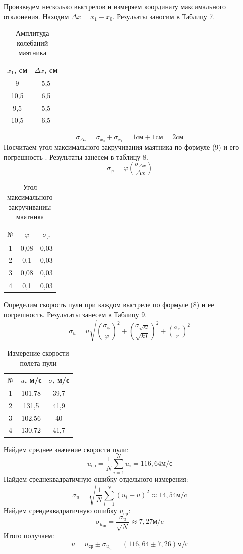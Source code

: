 \documentclass[a4paper,12pt]{article} %
\begin{document}
Произведем несколько выстрелов и измеряем координату максимального отклонения. Находим $\Delta x = x_1-x_0$. Резульаты заносим в Таблицу 7.
\begin{table}[h]
\caption{Амплитуда колебаний маятника}
\centering
\begin{tabular}{|c|c|}
\hline
$x_1$, cм & $\Delta x$, cм \\ \hline
9 & 5,5 \\ \hline
10,5 & 6,5\\ \hline
9,5 & 5,5\\ \hline
10,5 & 6,5\\ \hline
\end{tabular}
\end{table}
\[\sigma_{\Delta_x} = \sigma_{x_0} + \sigma_{x_1} = 1\text{cм}+1\text{cм} = 2\text{cм}\]
Посчитаем угол максимального закручивания маятника по формуле (9) и его погрешность . Результаты занесем в таблицу 8. 
\[\sigma_{\varphi} = \varphi\left(\frac{\sigma_{\Delta x}}{\Delta x}\right)\]
\begin{table}[!h]
\caption{Угол максимального закручиваниы маятника}
\centering
\begin{tabular}{|c|c|c|}
\hline
$\text{№}$ & $\varphi$ & $\sigma_\varphi$ \\ \hline
1 & 0,08 & 0,03\\ \hline
2 & 0,1 & 0,03\\ \hline
3 & 0,08 & 0,03\\ \hline
4 & 0,1 & 0,03\\ \hline
\end{tabular}
\end{table}
\newpage
Определим скорость пули при каждом выстреле по формуле (8) и ее погрешность. Результаты занесем в Таблицу 9.
\[\sigma_u = u\sqrt{\left(\frac{\sigma_{\varphi}}{\varphi}\right)^2+\left(\frac{\sigma_{\sqrt{kI}}}{\sqrt{kI}}\right)^2+\left(\frac{\sigma_r}{r}\right)^2}\]
\begin{table}[h]
\centering
\caption{Измерение скорости полета пули}
\begin{tabular}{|c|c|c|}
\hline
$\text{№}$ & $u$, м/с & $\sigma$, м/с \\ \hline
1 & 101,78 & 39,7\\ \hline
2 & 131,5& 41,9\\ \hline
3& 102,56 & 40\\ \hline
4 & 130,72 & 41,7\\ \hline
\end{tabular}
\end{table}
Найдем среднее значение скорости пули:
\[u_\text{ср} = \frac{1}{N}\sum_{i=1}^{N}u_i = 116,64\text{м/с}\]
Найдем среднеквадратичную ошибку отдельного измерения:
\[\sigma_u = \sqrt{\frac{1}{N}\sum_{i=1}^N(u_i-\overline{u})^2} \approx 14,54\text{м/c}\]
Найдем срендеквадратичную ошибку ${u_\text{ср}}$:
\[\sigma_{u_\text{ср}} = \frac{\sigma_u}{\sqrt{N}}\approx 7,27\text{м/c}\]
Итого получаем:
\[u = u_\text{ср}\pm\sigma_{u_\text{ср}} = (116,64\pm7,26)\text{м/с}\]
\end{document}
